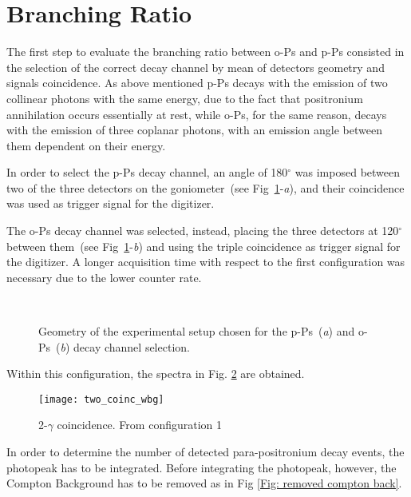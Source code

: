 \section*{Branching Ratio}

The first step to evaluate the branching ratio between o-Ps and p-Ps consisted in the selection of the correct decay channel by mean of detectors geometry and signals coincidence.
As above mentioned p-Ps decays with the emission of two collinear photons with the same energy, due to the fact that positronium annihilation occurs essentially at rest, while o-Ps, for the same reason, decays with the emission of three coplanar photons, with an emission angle between them dependent on their energy.

In order to select the p-Ps decay channel, an angle of 180$^\circ$ was imposed between two of the three detectors on the goniometer~(see Fig~\ref{Fig:PsGeometry}-\emph{a}), and their coincidence was used as trigger signal for the digitizer. 

The o-Ps decay channel was selected, instead, placing the three detectors at 120$^\circ$ between them~(see Fig~\ref{Fig:PsGeometry}-\emph{b}) and using the triple coincidence as trigger signal for the digitizer. A longer acquisition time with respect to the first configuration was necessary due to the lower counter rate.

 
\begin{figure}[h!]
	\centering
	 \quad
		 \\
	\caption{Geometry of the experimental setup chosen for the p-Ps~(\emph{a}) and o-Ps~(\emph{b}) decay channel selection.}
	\label{Fig:PsGeometry}
\end{figure}

Within this configuration, the spectra in Fig. \ref{Fig: 2gamma coinc with bg} are obtained.
\begin{figure}[H]
\centering
\texttt{[image: two\_coinc\_wbg]}
\caption{2-$\gamma$ coincidence. From configuration 1}
\label{Fig: 2gamma coinc with bg}
\end{figure}

In order to determine the number of detected para-positronium decay events, the photopeak has to be integrated.
Before integrating the photopeak, however, the Compton Background has to be removed as in Fig \ref{Fig: removed compton back}.

